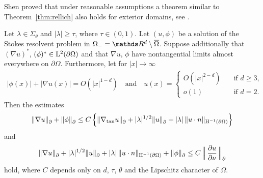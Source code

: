 Shen proved that under reasonable assumptions a theorem similar to Theorem~\ref{thm:rellich} also holds for exterior domains, see \cite[Thm. 4.6]{Shen2012}.

\begin{thm}
  \label{thm:rellichExterior}
  Let $\lambda \in \Sigma_\theta$ and $|\lambda| \geq \tau$, where $\tau \in (0,1)$.
  Let $(u,\phi)$ be a solution of the Stokes resolvent problem in $\Omega_- = \R^d \setminus \overline\Omega$.
  Suppose additionally that $(\nabla u)^*$, $(\phi)^* \in \mathrm{L}^2(\partial\Omega)$ and that $\nabla u$, $\phi$ have nontangential limits almost everywhere on $\partial\Omega$.
  Furthermore, let for $|x| \to \infty$
  \begin{align*}
    |\phi(x)| + |\nabla u(x)| = O(|x|^{1 - d}) \quad\text{and}\quad 
    u(x) = \begin{cases} O(|x|^{2 - d}) &\quad\text{if } d \geq 3, \\ o(1) &\quad\text{if } d = 2. \end{cases}
  \end{align*}
  Then the estimates
  \begin{align}
    \label{eq:rellich1ext}
    \|\nabla u\|^{}_\partial + \|\phi\|^{}_\partial
    \leq C\, \Big\{ \|\nabla_{\mathrm{tan}} u\|^{}_\partial + |\lambda|^{1/2} \|u\|^{}_\partial + |\lambda|\, \|u \cdot n\|_{\mathrm{H}^{-1}(\partial\Omega)} \Big\}
  \end{align}
  and
  \begin{align}
    \label{eq:rellich2ext}
    \|\nabla u\|^{}_\partial + |\lambda|^{1/2} \|u\|^{}_\partial + |\lambda| \, \|u \cdot n\|_{\mathrm{H}^{-1}(\partial\Omega)} + \|\phi\|^{}_\partial
    \leq C \, \Big\|\,\frac{\partial u}{\partial \nu} \,\Big\|^{}_\partial
  \end{align}
  hold, where $C$ depends only on $d$, $\tau$, $\theta$ and the Lipschitz character of $\Omega$.
\end{thm}
